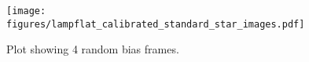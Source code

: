 \documentclass{aastex631}
\begin{document}
\begin{figure}[ht!]
    \begin{centering}
        \texttt{[image: figures/lampflat\_calibrated\_standard\_star\_images.pdf]}
        \caption{
            Plot showing 4 random bias frames.
        }
        \label{fig:master_dark}
    \end{centering}
\end{figure}



\end{document}
